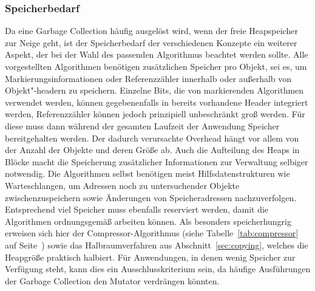 

\subsubsection*{Speicherbedarf}
Da eine Garbage Collection häufig ausgelöst wird, wenn der freie Heapspeicher zur Neige geht, ist der Speicherbedarf der verschiedenen Konzepte ein weiterer Aspekt, der bei der Wahl des passenden Algorithmus beachtet werden sollte.
Alle vorgestellten Algorithmen benötigen zusätzlichen Speicher pro Objekt, sei es, um Markierungsinformationen oder Referenzzähler innerhalb oder außerhalb von Objekt"-headern zu speichern.
Einzelne Bits, die von markierenden Algorithmen verwendet werden, können gegebenenfalls in bereits vorhandene Header integriert werden, Referenzzähler können jedoch prinzipiell unbeschränkt groß werden.
Für diese muss dann während der gesamten Laufzeit der Anwendung Speicher bereitgehalten werden.
Der dadurch verursachte Overhead hängt vor allem von der Anzahl der Objekte und deren Größe ab.
Auch die Aufteilung des Heaps in Blöcke macht die Speicherung zusätzlicher Informationen zur Verwaltung selbiger notwendig.
Die Algorithmen selbst benötigen meist Hilfsdatenstrukturen wie Warteschlangen, um Adressen noch zu untersuchender Objekte zwischenzuspeichern sowie Änderungen von Speicheradressen nachzuverfolgen.
Entsprechend viel Speicher muss ebenfalls reserviert werden, damit die Algorithmen ordnungsgemäß arbeiten können.
Als besonders speicherhungrig erweisen sich hier der Compressor-Algorithmus (siehe Tabelle~\ref{tab:compressor} auf Seite~\pageref{tab:compressor}) sowie das Halbraumverfahren aus Abschnitt~\ref{sec:copying}, welches die Heapgröße praktisch halbiert.
Für Anwendungen, in denen wenig Speicher zur Verfügung steht, kann dies ein Ausschlusskriterium sein, da häufige Ausführungen der Garbage Collection den Mutator verdrängen könnten.




